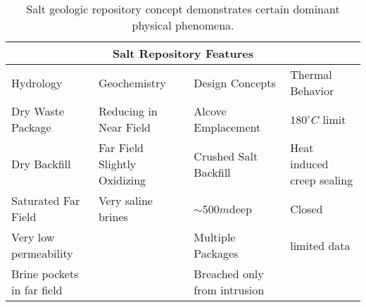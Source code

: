 %
\begin{table}[h!]
  \centering
  \footnotesize{
  \begin{tabularx}{\textwidth}{|l|l|X|X|}
    \multicolumn{4}{c}{\textbf{Salt Repository Features}}\\
    \hline
    Hydrology & Geochemistry & Design Concepts & Thermal Behavior \\ 
    \hline
    Dry Waste Package & Reducing in Near Field & Alcove Emplacement & $180^\circ C$ limit \cite{von_lensa_red-impact_2008} \\
    Dry Backfill &Far Field Slightly Oxidizing &Crushed Salt Backfill & Heat induced creep sealing\\
    Saturated Far Field& Very saline brines  &$\sim500m$deep & Closed \\
    Very low permeability &  & Multiple Packages &limited data\\
    Brine pockets in far field&&Breached only from intrusion&\\
    \hline
  \end{tabularx}
  \caption[Salt repository features.]{Salt geologic repository 
  concept demonstrates certain dominant physical phenomena. }
  \label{tab:salt_tab}
  }
\end{table}




